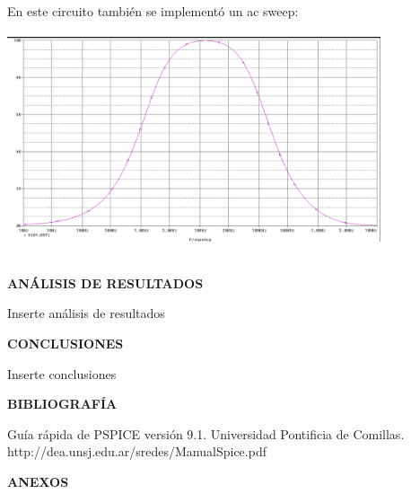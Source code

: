 \documentclass[12pt]{article}
\begin{document}
\begin{itemize}
		\noindent En este circuito también se implementó un ac sweep:\\
		
		\includegraphics[width=11cm,height=7cm]{Img/filtro_pasa_alto_activo}\\
		
	\end{itemize}
	
	\newpage
	
	\begin{center}
		\textbf{\large ANÁLISIS DE RESULTADOS}\\
	\end{center}
	
	Inserte análisis de resultados
	
	\newpage
	
	\begin{center}
		\textbf{\large CONCLUSIONES}\\
	\end{center}
	
	Inserte conclusiones
	
	\newpage
	
	\begin{center}
		\textbf{\large BIBLIOGRAFÍA}\\
	\end{center}
	
	Guía rápida de PSPICE versión 9.1. Universidad Pontificia de Comillas.\\
	http://dea.unsj.edu.ar/sredes/ManualSpice.pdf
	
	\newpage
	
	\begin{center}
		\textbf{\large ANEXOS}\\
	\end{center}
	
\end{document}
